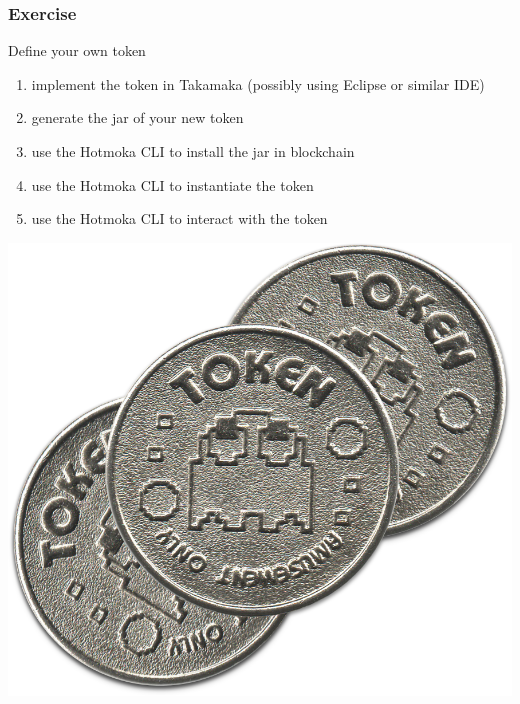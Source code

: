 \documentclass[11pt]{beamer}  %
\begin{document}
\begin{frame}\frametitle{Exercise}

  \begin{greenbox}{Define your own token}
  \begin{enumerate}
  \item implement the token in Takamaka (possibly using Eclipse or similar IDE)
  \item generate the jar of your new token
  \item use the Hotmoka CLI to install the jar in blockchain
  \item use the Hotmoka CLI to instantiate the token
  \item use the Hotmoka CLI to interact with the token
  \end{enumerate}
  \end{greenbox}

  \bigskip

  \begin{center}
    \includegraphics[scale=0.12,clip=false]{pictures/tokens.png}
  \end{center}

\end{frame}
\end{document}
